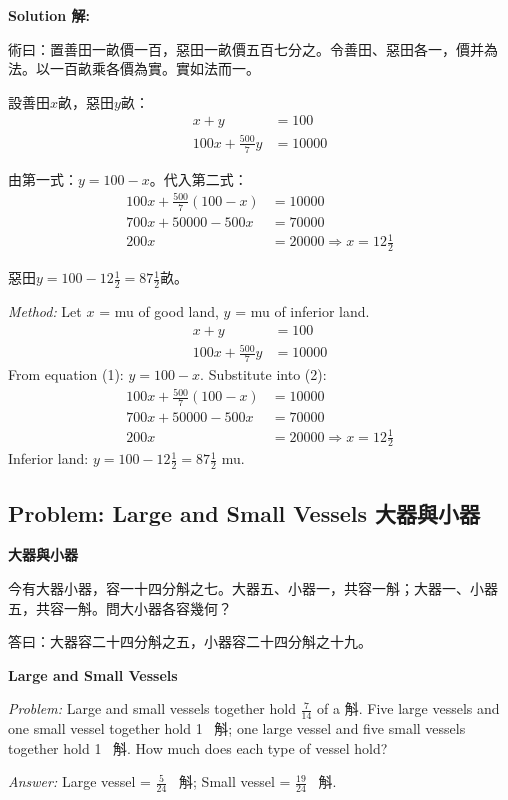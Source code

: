 \documentclass[11pt,a4paper]{article}
\newcommand{\zh}[1]{{\CJKfamily{\CJKrmdefault} #1}}
\newenvironment{chside}{%
  \begin{minipage}[t]{0.48\textwidth}%
  \setlength{\parindent}{1.5em}%
  \linespread{1.25}\selectfont%
  \small%
}{%
  \end{minipage}%
}
\newenvironment{enside}{%
  \hfill\begin{minipage}[t]{0.48\textwidth}%
  \setlength{\parindent}{1em}%
  \linespread{1.15}\selectfont%
  \small%
}{%
  \end{minipage}%
}
\newenvironment{solution}{%
  \par\medskip\noindent\textbf{\textcolor{notecolor}{Solution \zh{解}:}}\par\nopagebreak
  \small\setlength{\parindent}{1em}%
}{%
  \par\medskip%
}
\begin{document}
\begin{solution}
\noindent\begin{chside}
\zh{術曰：置善田一畝價一百，惡田一畝價五百七分之。令善田、惡田各一，價并為法。以一百畝乘各價為實。實如法而一。}

設善田$x$畝，惡田$y$畝：
\begin{align*}
x + y &= 100 \\
100x + \frac{500}{7}y &= 10000
\end{align*}

由第一式：$y = 100 - x$。代入第二式：
\begin{align*}
100x + \frac{500}{7}(100 - x) &= 10000 \\
700x + 50000 - 500x &= 70000 \\
200x &= 20000 \Rightarrow x = 12\tfrac{1}{2}
\end{align*}

惡田$y = 100 - 12\frac{1}{2} = 87\frac{1}{2}$畝。
\end{chside}%
\begin{enside}
\textit{Method:} Let $x$ = mu of good land, $y$ = mu of inferior land.
\begin{align*}
x + y &= 100 \\
100x + \frac{500}{7}y &= 10000
\end{align*}
From equation (1): $y = 100 - x$. Substitute into (2):
\begin{align*}
100x + \frac{500}{7}(100 - x) &= 10000 \\
700x + 50000 - 500x &= 70000 \\
200x &= 20000 \Rightarrow x = 12\tfrac{1}{2}
\end{align*}
Inferior land: $y = 100 - 12\frac{1}{2} = 87\frac{1}{2}$ mu.
\end{enside}
\end{solution}

\subsection{Problem: Large and Small Vessels \zh{大器與小器}}

\noindent\begin{chside}
\noindent\textbf{大器與小器}

\zh{今有大器小器，容一十四分斛之七。大器五、小器一，共容一斛；大器一、小器五，共容一斛。問大小器各容幾何？}

\medskip
\zh{答曰：大器容二十四分斛之五，小器容二十四分斛之十九。}
\end{chside}%
\begin{enside}
\noindent\textbf{Large and Small Vessels}

\textit{Problem:} Large and small vessels together hold $\frac{7}{14}$ of a
\zh{斛}. Five large vessels and one small vessel together hold 1~\zh{斛};
one large vessel and five small vessels together hold 1~\zh{斛}. How much
does each type of vessel hold?

\medskip
\textit{Answer:} Large vessel = $\frac{5}{24}$~\zh{斛}; Small vessel =
$\frac{19}{24}$~\zh{斛}.
\end{enside}
\end{document}
